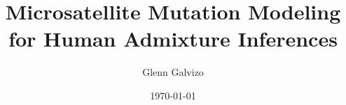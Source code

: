 \documentclass[11pt]{article}
\author{Glenn Galvizo}
\title{Microsatellite Mutation Modeling for Human Admixture Inferences}
\date{\today}
\begin{document}
    \maketitle
    
    \newpage

    \tableofcontents
    \newpage

    
    
    
    
    
    

    \nocite{*}
    
	
\end{document}

